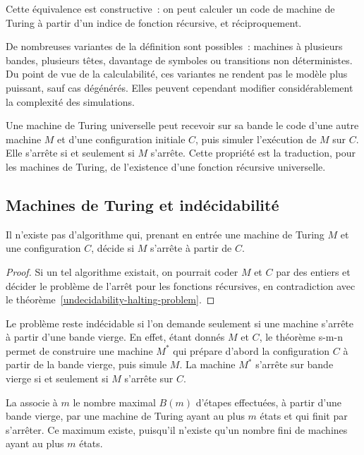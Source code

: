 
Cette équivalence est constructive : on peut calculer un code de
machine de Turing à partir d'un indice de fonction récursive, et
réciproquement.

\thingy De nombreuses variantes de la définition sont possibles :
machines à plusieurs bandes, plusieurs têtes, davantage de symboles ou
transitions non déterministes.  Du point de vue de la calculabilité,
ces variantes ne rendent pas le modèle plus puissant, sauf cas
dégénérés.  Elles peuvent cependant modifier considérablement la
complexité des simulations.

Une machine de Turing universelle peut recevoir sur sa bande le code
d'une autre machine $M$ et d'une configuration initiale $C$, puis
simuler l'exécution de $M$ sur $C$.  Elle s'arrête si et seulement si
$M$ s'arrête.  Cette propriété est la traduction, pour les machines de
Turing, de l'existence d'une fonction récursive universelle.

\subsection{Machines de Turing et indécidabilité}

\begin{thm}\label{halting-problem-turing-machines}
Il n'existe pas d'algorithme qui, prenant en entrée une machine de
Turing $M$ et une configuration $C$, décide si $M$ s'arrête à partir
de $C$.
\end{thm}

\begin{proof}
Si un tel algorithme existait, on pourrait coder $M$ et $C$ par des
entiers et décider le problème de l'arrêt pour les fonctions
récursives, en contradiction avec le
théorème \ref{undecidability-halting-problem}.
\end{proof}

Le problème reste indécidable si l'on demande seulement si une machine
s'arrête à partir d'une bande vierge.  En effet, étant donnés $M$ et
$C$, le théorème s-m-n permet de construire une machine $M^*$ qui
prépare d'abord la configuration $C$ à partir de la bande vierge, puis
simule $M$.  La machine $M^*$ s'arrête sur bande vierge si et seulement
si $M$ s'arrête sur $C$.

\thingy La  associe à
$m$ le nombre maximal $B(m)$ d'étapes effectuées, à partir d'une bande
vierge, par une machine de Turing ayant au plus $m$ états et qui finit
par s'arrêter.  Ce maximum existe, puisqu'il n'existe qu'un nombre fini
de machines ayant au plus $m$ états.

